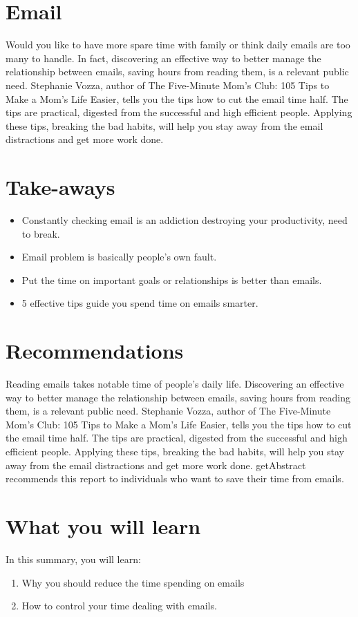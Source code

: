 \documentclass[fleqn,10pt]{SelfArx} %
\begin{document}
\section*{Email}
Would you like to have more spare time with family or think daily emails are too many to handle. In fact, discovering an effective way to better manage the relationship between emails, saving hours from reading them, is a relevant public need. Stephanie Vozza, author of The Five-Minute Mom's Club: 105 Tips to Make a Mom's Life Easier, tells you the tips how to cut the email time half. The tips are practical, digested from the successful and high efficient people. Applying these tips, breaking the bad habits, will help you stay away from the email distractions and get more work done.


\section*{Take-aways}
\begin{itemize}
\item Constantly checking email is an addiction destroying your productivity, need to break. 
\item Email problem is basically people's own fault.
\item Put the time on important goals or relationships is better than emails. 
\item 5 effective tips guide you spend time on emails smarter. 
\end{itemize}

\section*{Recommendations}
Reading emails takes notable time of people's daily life. Discovering an effective way to better manage the relationship between emails, saving hours from reading them, is a relevant public need. Stephanie Vozza, author of The Five-Minute Mom's Club: 105 Tips to Make a Mom's Life Easier, tells you the tips how to cut the email time half. The tips are practical, digested from the successful and high efficient people. Applying these tips, breaking the bad habits, will help you stay away from the email distractions and get more work done. getAbstract recommends this report to individuals who want to save their time from emails. 

\section*{What you will learn}
In this summary, you will learn:
\begin{enumerate}
\item Why you should reduce the time spending on emails 
\item How to control your time dealing with emails. 
\end{enumerate} 
\end{document}
